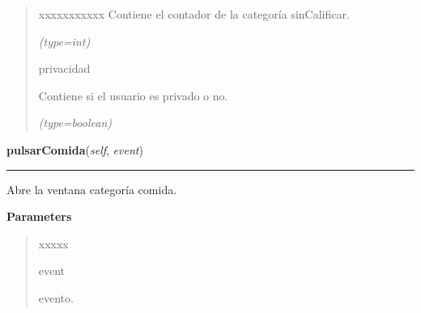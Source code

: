 \begin{boxedminipage}{\funcwidth}
\begin{quote}
\begin{Ventry}{xxxxxxxxxxx}
          Contiene el contador de la categoría sinCalificar.

            {\it (type=int)}

          \item[privacidad]

          Contiene si el usuario es privado o no.

            {\it (type=boolean)}

        \end{Ventry}

      \end{quote}

    \end{boxedminipage}

    \label{informacion:Informacion:pulsarComida}

    \vspace{0.5ex}

\hspace{.8\funcindent}\begin{boxedminipage}{\funcwidth}

    \raggedright \textbf{pulsarComida}(\textit{self}, \textit{event})

    \vspace{-1.5ex}

    \rule{\textwidth}{0.5\fboxrule}
\setlength{\parskip}{2ex}
    Abre la ventana categoría comida.

\setlength{\parskip}{1ex}
      \textbf{Parameters}
      \vspace{-1ex}

      \begin{quote}
        \begin{Ventry}{xxxxx}

          \item[event]

          evento.

        \end{Ventry}

      \end{quote}

    \end{boxedminipage}

    \label{informacion:Informacion:pulsarAnimales}

